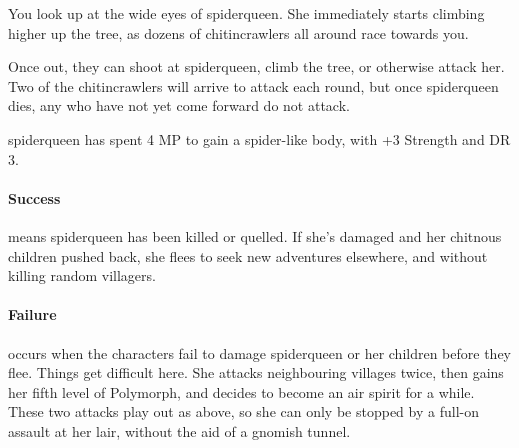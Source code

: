 \begin{multicols}{2}
\begin{boxtext}

	You look up at the wide eyes of \gls{spiderqueen}. She immediately starts climbing higher up the tree, as dozens of chitincrawlers all around race towards you.

\end{boxtext}

Once out, they can shoot at \gls{spiderqueen}, climb the tree, or otherwise attack her.  Two of the chitincrawlers will arrive to attack each round, but once \gls{spiderqueen} dies, any who have not yet come forward do not attack.


\gnomishillusionist


\gnome


\gnome

\label{spiderqueen}


\Gls{spiderqueen} has spent 4 MP to gain a spider-like body, with +3 Strength and DR 3.

\chitincrawler

\paragraph{Success} means \gls{spiderqueen} has been killed or quelled.
If she's damaged and her chitnous children pushed back, she flees to seek new adventures elsewhere, and without killing random villagers.

\paragraph{Failure} occurs when the characters fail to damage \gls{spiderqueen} or her children before they flee.
Things get difficult here.
She attacks neighbouring villages twice, then gains her fifth level of Polymorph, and decides to become an air spirit for a while.
These two attacks play out as above, so she can only be stopped by a full-on assault at her lair, without the aid of a gnomish tunnel.


\end{multicols}

